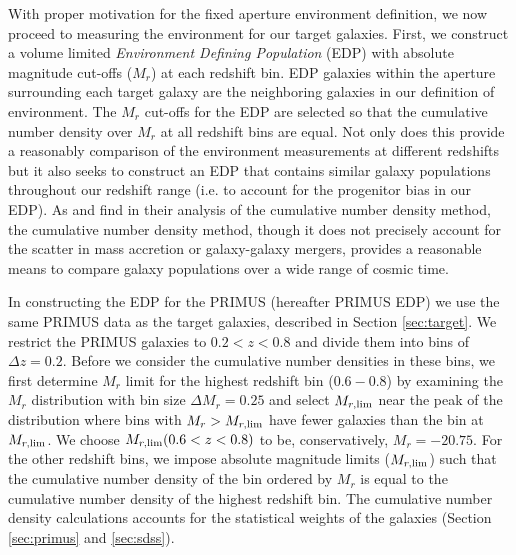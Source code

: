 \documentclass{emulateapj}
\begin{document}
With proper motivation for the fixed aperture environment definition, 
we now proceed to measuring the environment for our target galaxies. 
First, we construct a volume limited {\em Environment Defining 
Population} (EDP) with absolute magnitude cut-offs ($M_{r}$) at 
each redshift bin. EDP galaxies within the aperture surrounding each 
target galaxy are the neighboring galaxies in our definition of 
environment. The $M_{r}$ cut-offs for the EDP are selected so that 
the cumulative number density over $M_{r}$ at all redshift bins are 
equal. Not only does this provide a reasonably comparison of the 
environment measurements at different redshifts but it also seeks 
to construct an EDP that contains similar galaxy populations 
throughout our redshift range (i.e. to account for the progenitor bias 
in our EDP). As \cite{Behroozi:2013aa} and \cite{Leja:2013aa} find 
in their analysis of the cumulative number density method, the 
cumulative number density method, though it does not precisely 
account for the scatter in mass accretion or galaxy-galaxy mergers, 
provides a reasonable means to compare galaxy populations over 
a wide range of cosmic time. 

In constructing the EDP for the PRIMUS (hereafter PRIMUS EDP) we use the same PRIMUS data as the 
target galaxies, described in Section \ref{sec:target}. 
We restrict the PRIMUS galaxies to $0.2 < z < 0.8$ and divide them into bins of $\Delta z = 0.2$. 
Before we consider the cumulative number densities in these bins, we first determine $M_r$ limit for the 
highest redshift bin ($0.6-0.8$) by examining the $M_{r}$ distribution with bin size $\Delta M_{r} = 0.25$ 
and select $M_{r,\rm{lim}}$ near the peak of the distribution where bins with $M_{r} > M_{r,\rm{lim}}$ 
have fewer galaxies than the bin at $M_{r, \rm{lim}}$. 
We choose $M_{r, \rm{lim}}(0.6 < z < 0.8)$ to be, conservatively, $M_{r} = -20.75$. 
For the other redshift bins, we impose absolute magnitude limits ($M_{r,\rm{lim}}$) such 
that the cumulative number density of the bin ordered by $M_{r}$ is equal to the cumulative 
number density of the highest redshift bin. 
The cumulative number density calculations accounts for the statistical weights of the galaxies (Section 
\ref{sec:primus} and \ref{sec:sdss}).
\end{document}
